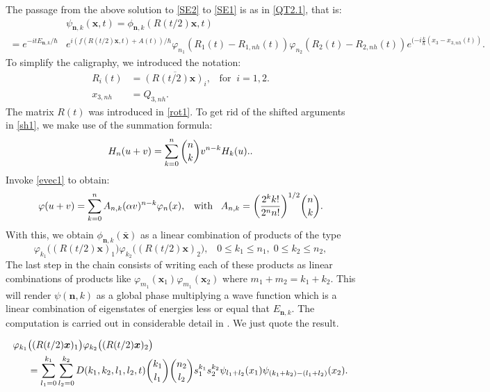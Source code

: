 \documentclass[12pt]{article}
\numberwithin{equation}{section}
\def\bx{{\boldsymbol x}}
\def\bn{{\boldsymbol n}}
\begin{document}
The passage from the above solution to \eqref{SE2} to \eqref{SE1} is as in \eqref{QT2.1}, that is:
\begin{equation}\label{eigst3}
\begin{aligned}
&\psi_{\bn,k}(\bx,t) = \phi_{\bn,k}(R(t/2)\bx,t)\\
=  e^{-itE_{\bn,k}/\hbar}&e^{i(f(R(t/2)\bx,t) + A(t))/\hbar}\varphi_{n_1}(R_1(t)-R_{1,nh}(t))\varphi_{n_2}(R_2(t)-R_{2,nh}(t))e^{(-i\frac{k}{\hbar}(x_3-x_{3,nh}(t))}.
\end{aligned}
\end{equation}
To simplify the caligraphy, we introduced the notation:
\begin{equation}\label{sh1}
\begin{aligned}
R_i(t) &= \overline{(R(t/2)\bx)_i},\;\;\;\mbox{for} \;\;i=1,2.\\
x_{3,nh} &= Q_{3,nh}.
\end{aligned}
\end{equation}
The matrix $R(t)$ was introduced in \eqref{rot1}. To get rid of the shifted arguments in \eqref{sh1}, we make use of the summation formula:
\begin{equation}\label{summ}
H_n(u+v)=\sum_{k=0}^n{n\atopwithdelims()k}v^{n-k}H_k(u)..
\end{equation}
Invoke \eqref{evec1} to obtain:
\begin{equation}\label{evec2}
\varphi(u+v) = \sum_{k=0}^n A_{n,k}(\alpha v)^{n-k}\varphi_n(x), \;\;\;\mbox{with}\;\;\; A_{n,k}=\bigg(\frac{2^kk!}{2^nn!}\bigg)^{1/2}{n\atopwithdelims()k}.
\end{equation}
With this, we obtain $\phi_{\bn,k}(\bar{\bx})$ as a linear combination of products of the type 
$$\varphi_{k_1}\big((R(t/2)\bx)_1\big)\varphi_{k_2}\big((R(t/2)\bx)_2\big),\;\;\;0\leq k_1\leq n_1,\;0\leq k_2\leq n_2,$$
The last step in the chain consists of writing each of these products as linear combinations of products like $\varphi_{m_1}(\bx_1)\varphi_{m_1}(\bx_2)$ where $m_1+m_2=k_1+k_2.$ This will render $\psi(\bn,k)$ as a global phase multiplying a wave function which is a linear combination of eigenstates of energies less or equal that $E_{\bn,k}.$ The computation is carried out in considerable detail in \cite{Gz1}. We just quote the result.

\begin{equation}\label{entang}
\begin{aligned}
\varphi_{k_1}&\big((R(t/2)\bx)_1\big)\varphi_{k_2}\big((R(t/2)\bx)_2\big)\\
& =\sum_{l_1=0}^{k_1}\sum_{l_2=0}^{k_2}D(k_1,k_2,l_1,l_2,t){k_1\atopwithdelims()l_1}{n_2\atopwithdelims()l_2}s^{k_1}_1s^{k_2}_2\psi_{l_1+l_2}(x_1)\psi_{(k_1+k_2)-(l_1+l_2)}(x_2).
\end{aligned}
\end{equation}
\end{document}
